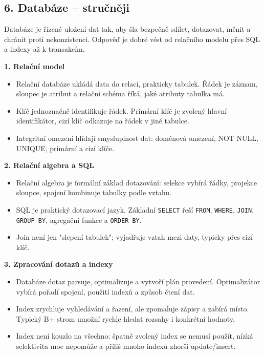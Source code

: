 
\subsection*{6. Databáze -- stručněji}
Databáze je řízené uložení dat tak, aby šla bezpečně sdílet, dotazovat, měnit a chránit proti nekonzistenci. Odpověď je dobré vést od relačního modelu přes SQL a indexy až k transakcím.

\textbf{1. Relační model}
\begin{itemize}
  \item Relační databáze ukládá data do relací, prakticky tabulek. Řádek je záznam, sloupec je atribut a relační schéma říká, jaké atributy tabulka má.
  \item Klíč jednoznačně identifikuje řádek. Primární klíč je zvolený hlavní identifikátor, cizí klíč odkazuje na řádek v jiné tabulce.
  \item Integritní omezení hlídají smysluplnost dat: doménová omezení, NOT NULL, UNIQUE, primární a cizí klíče.
\end{itemize}

\textbf{2. Relační algebra a SQL}
\begin{itemize}
  \item Relační algebra je formální základ dotazování: selekce vybírá řádky, projekce sloupce, spojení kombinuje tabulky podle vztahu.
  \item SQL je praktický dotazovací jazyk. Základní \texttt{SELECT} řeší \texttt{FROM}, \texttt{WHERE}, \texttt{JOIN}, \texttt{GROUP BY}, agregační funkce a \texttt{ORDER BY}.
  \item Join není jen "slepení tabulek"; vyjadřuje vztah mezi daty, typicky přes cizí klíč.
\end{itemize}

\textbf{3. Zpracování dotazů a indexy}
\begin{itemize}
  \item Databáze dotaz parsuje, optimalizuje a vytvoří plán provedení. Optimalizátor vybírá pořadí spojení, použití indexů a způsob čtení dat.
  \item Index zrychluje vyhledávání a řazení, ale zpomaluje zápisy a zabírá místo. Typický B+ strom umožní rychle hledat rozsahy i konkrétní hodnoty.
  \item Index není kouzlo na všechno: špatně zvolený index se nemusí použít, nízká selektivita moc nepomůže a příliš mnoho indexů zhorší update/insert.
\end{itemize}

